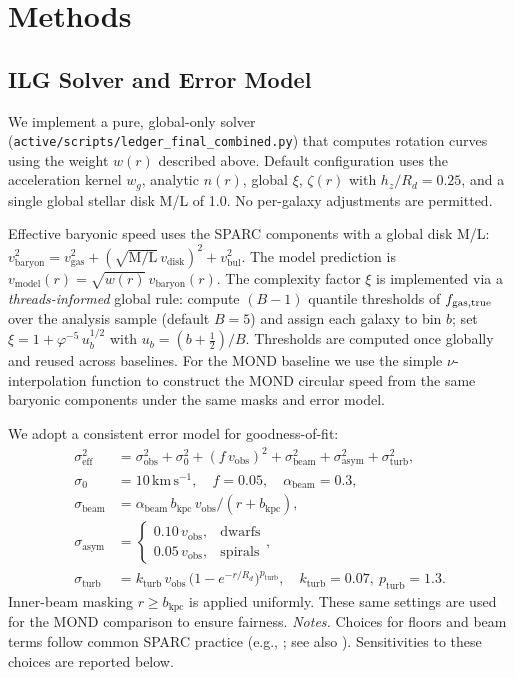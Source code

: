 \documentclass[12pt,a4paper]{article}
\begin{document}
\section{Methods}

\subsection{ILG Solver and Error Model}

We implement a pure, global-only solver (\texttt{active/scripts/ledger\_final\_combined.py}) that computes rotation curves using the weight $w(r)$ described above. Default configuration uses the acceleration kernel $w_g$, analytic $n(r)$, global $\xi$, $\zeta(r)$ with $h_z/R_d=0.25$, and a single global stellar disk M/L of 1.0. No per-galaxy adjustments are permitted.

Effective baryonic speed uses the SPARC components with a global disk M/L: $v_\mathrm{baryon}^2 = v_\mathrm{gas}^2 + (\sqrt{\mathrm{M/L}}\,v_\mathrm{disk})^2 + v_\mathrm{bul}^2$. The model prediction is $v_\mathrm{model}(r) = \sqrt{w(r)}\, v_\mathrm{baryon}(r)$. The complexity factor $\xi$ is implemented via a \emph{threads-informed} global rule: compute $(B{-}1)$ quantile thresholds of $f_{\rm gas,true}$ over the analysis sample (default $B{=}5$) and assign each galaxy to bin $b$; set $\xi=1+\varphi^{-5}\,u_b^{1/2}$ with $u_b=(b+\tfrac{1}{2})/B$. Thresholds are computed once globally and reused across baselines.
For the MOND baseline we use the simple $\nu$-interpolation function to construct the MOND circular speed from the same baryonic components under the same masks and error model.

We adopt a consistent error model for goodness-of-fit:
\begin{align}
\sigma_\mathrm{eff}^2 &= \sigma_\mathrm{obs}^2 + \sigma_0^2 + (f\,v_\mathrm{obs})^2 + \sigma_\mathrm{beam}^2 + \sigma_\mathrm{asym}^2 + \sigma_\mathrm{turb}^2,\\
\sigma_0 &= 10\,\mathrm{km\,s^{-1}},\quad f = 0.05,\quad \alpha_\mathrm{beam}=0.3,\\
\sigma_\mathrm{beam} &= \alpha_\mathrm{beam}\, b_\mathrm{kpc}\, v_\mathrm{obs}/(r+b_\mathrm{kpc}),\\
\sigma_\mathrm{asym} &= \begin{cases}0.10\,v_\mathrm{obs}, & \text{dwarfs}\\ 0.05\,v_\mathrm{obs}, & \text{spirals}\end{cases},\\
\sigma_\mathrm{turb} &= k_\mathrm{turb}\, v_\mathrm{obs}\,\big(1-e^{-r/R_d}\big)^{p_\mathrm{turb}},\quad k_\mathrm{turb}=0.07,\ p_\mathrm{turb}=1.3.
\end{align}
Inner-beam masking $r\ge b_\mathrm{kpc}$ is applied uniformly. These same settings are used for the MOND comparison to ensure fairness.
\noindent\textit{Notes.} Choices for floors and beam terms follow common SPARC practice (e.g., \citealp{lelli2016sparc}; see also \citealp{mcgaugh2016}). Sensitivities to these choices are reported below.
\end{document}
